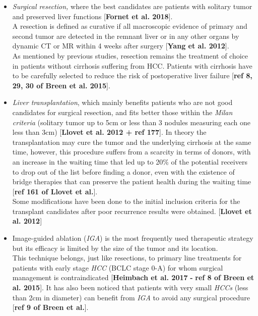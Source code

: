 \documentclass[]{article}
\providecommand{\tightlist}{%
  \setlength{\itemsep}{0pt}\setlength{\parskip}{0pt}}
\begin{document}
\begin{itemize}
\tightlist
\item
  \emph{Surgical resection,} where the best candidates are patients with
  solitary tumor and preserved liver functions {[}\textbf{Fornet et al.
  2018}{]}.\\
  A resection is defined as curative if all macroscopic evidence of
  primary and second tumor are detected in the remnant liver or in any
  other organs by dynamic CT or MR within 4 weeks after surgery
  {[}\textbf{Yang et al. 2012}{]}.\\
  As mentioned by previous studies, resection remains the treatment of
  choice in patients without cirrhosis suffering from HCC. Patients with
  cirrhosis have to be carefully selected to reduce the risk of
  postoperative liver failure {[}\textbf{ref 8, 29, 30 of Breen et al.
  2015}{]}.
\item
  \emph{Liver transplantation}, which mainly benefits patients who are
  not good candidates for surgical resection, and fits better those
  within the \emph{Milan criteria} (solitary tumor up to 5cm or less
  than 3 nodules measuring each one less than 3cm) {[}\textbf{Llovet et
  al. 2012 + ref 177}{]}. In theory the transplantation may cure the
  tumor and the underlying cirrhosis at the same time, however, this
  procedure suffers from a scarcity in terms of donors, with an increase
  in the waiting time that led up to 20\% of the potential receivers to
  drop out of the list before finding a donor, even with the existence
  of bridge therapies that can preserve the patient health during the
  waiting time {[}\textbf{ref 161 of Llovet et al.}{]}.\\
  Some modifications have been done to the initial inclusion criteria
  for the transplant candidates after poor recurrence results were
  obtained. {[}\textbf{Llovet et al. 2012}{]}
\item
  Image-guided ablation (\emph{IGA}) is the most frequently used
  therapeutic strategy but its efficacy is limited by the size of the
  tumor and its location.\\
  This technique belongs, just like resections, to primary line
  treatments for patients with early stage \emph{HCC} (BCLC stage 0-A)
  for whom surgical management is contraindicated {[}\textbf{Heimbach et
  al. 2017} \textbf{-} \textbf{ref 8 of Breen et al. 2015}{]}. It has
  also been noticed that patients with very small \emph{HCCs} (less than
  2cm in diameter) can benefit from \emph{IGA} to avoid any surgical
  procedure {[}\textbf{ref 9 of Breen et al.}{]}.\\

\end{itemize}
\end{document}
